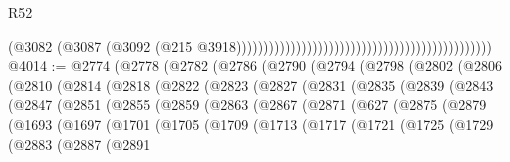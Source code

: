 \begin{lexlean}{R52}
\begin{coremodule}
                                                                                          (@3082
                                                                                            (@3087
                                                                                              (@3092
                                                                                                (@215
                                                                                                  @3918)))))))))))))))))))))))))))))))))))))))))))))))
@4014 := @2774
    (@2778
      (@2782
        (@2786
          (@2790
            (@2794
              (@2798
                (@2802
                  (@2806
                    (@2810
                      (@2814
                        (@2818
                          (@2822
                            (@2823
                              (@2827
                                (@2831
                                  (@2835
                                    (@2839
                                      (@2843
                                        (@2847
                                          (@2851
                                            (@2855
                                              (@2859
                                                (@2863
                                                  (@2867
                                                    (@2871
                                                      (@627
                                                        (@2875
                                                          (@2879
                                                            (@1693
                                                              (@1697
                                                                (@1701
                                                                  (@1705
                                                                    (@1709
                                                                      (@1713
                                                                        (@1717
                                                                          (@1721
                                                                            (@1725
                                                                              (@1729
                                                                                (@2883
                                                                                  (@2887
                                                                                    (@2891

\end{coremodule}
\end{lexlean}
